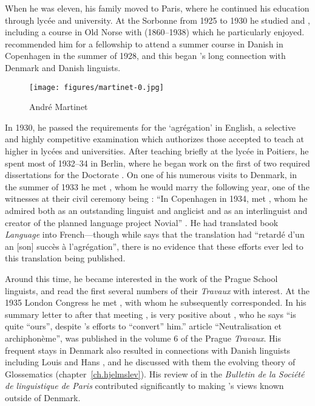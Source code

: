 When he was eleven, his family moved to Paris, where he continued his
education through lycée and university. At the Sorbonne from 1925 to
1930 he studied  and , including a course in Old Norse
with  (1860--1938) which he particularly enjoyed. {\Verrier}
recommended him for a fellowship to attend a summer course in {Danish}
in Copenhagen in the summer of 1928, and this began {\Martinet}'s long
connection with Denmark and {Danish} linguists.

\begin{wrapfigure}{r}{.35\textwidth}
  \texttt{[image: figures/martinet-0.jpg]}
  \caption{André Martinet}
  \label{fig:ch.martinet.martinet0}
\end{wrapfigure}
In 1930, he passed the requirements for the `agrégation' in {English}, a
selective and highly competitive examination which authorizes those
accepted to teach at higher  in lycées and universities.  After
teaching briefly at the lycée in Poitiers, he spent most of 1932--34
in Berlin, where he began work on the first of two required
dissertations for the Doctorate \citep[][on  consonant
gemination]{martinet37:thesis}.  On one of his numerous visits to
Denmark, in the summer of 1933 he met , whom
he would marry the following year, one of the witnesses at their civil
ceremony being : ``In Copenhagen in 1934, {\Martinet} met
, whom he admired both as an outstanding linguist and
anglicist and as an interlinguist and creator of the planned language
project Novial'' \citep[276]{klare12:martinet}.  He had translated
 book \textsl{Language} into
{French}---though while \citet[158]{martinet91:bio} says that the
translation had ``retardé d'un an [son] succès à l'agrégation'', there
is no evidence that these efforts ever led to this translation being
published.

Around this time, he became interested in the work of the Prague
School linguists, and read the first several numbers of their
\textsl{Travaux} with interest. At the 1935 London Congress he met
{\Trubetzkoy}, with whom he subsequently corresponded. In his summary
letter to {\Jakobson} after that meeting
\citep[246--248]{liberman01:trubetzkoy.anthology}, {\Trubetzkoy} is very
positive about {\Martinet}, who he says ``is quite ``ours'', despite
{\Hjelmslev}'s efforts to ``convert'' him.''
 article ``Neutralisation et
archi\-pho\-nème'', was published in the volume 6 of the Prague
\textsl{Travaux}.  His frequent stays in Denmark also resulted in
connections with {Danish} linguists including Louis {\Hjelmslev} and Hans
{\Uldall}, and he discussed with them the evolving theory of Glossematics
(chapter~\ref{ch.hjelmslev}). His \citeyear{martinet46:rvw.hjelmslev}
review of \citealt{hjelmslev43:prolegomena} in the \textsl{Bulletin de
  la Société de linguistique de Paris} contributed significantly to
making {\Hjelmslev}'s views known outside of Denmark.

